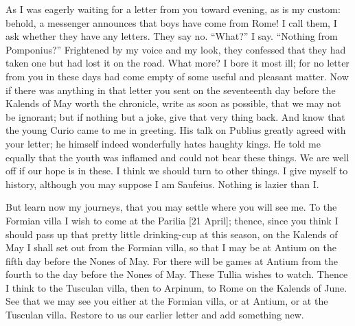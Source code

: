 

 As I was eagerly waiting for a letter from you toward evening, as is my custom: behold, a messenger announces that boys have come from Rome! I call them, I ask whether they have any letters. They say no. ``What?'' I say. ``Nothing from Pomponius?'' Frightened by my voice and my look, they confessed that they had taken one but had lost it on the road. What more? I bore it most ill; for no letter from you in these days had come empty of some useful and pleasant matter. Now if there was anything in that letter you sent on the seventeenth day before the Kalends of May worth the chronicle, write as soon as possible, that we may not be ignorant; but if nothing but a joke, give that very thing back. And know that the young Curio came to me in greeting. His talk on Publius greatly agreed with your letter; he himself indeed wonderfully hates haughty kings. He told me equally that the youth was inflamed and could not bear these things. We are well off if our hope is in these. I think we should turn to other things. I give myself to history, although you may suppose I am Saufeius. Nothing is lazier than I.

 But learn now my journeys, that you may settle where you will see me. To the Formian villa I wish to come at the Parilia [21 April]; thence, since you think I should pass up that pretty little drinking-cup at this season, on the Kalends of May I shall set out from the Formian villa, so that I may be at Antium on the fifth day before the Nones of May. For there will be games at Antium from the fourth to the day before the Nones of May. These Tullia wishes to watch. Thence I think to the Tusculan villa, then to Arpinum, to Rome on the Kalends of June. See that we may see you either at the Formian villa, or at Antium, or at the Tusculan villa. Restore to us our earlier letter and add something new.
